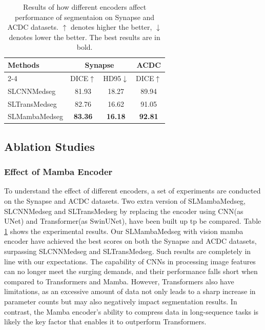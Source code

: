 \documentclass[letterpaper, 10 pt, conference]{ieeeconf}  %
\begin{document}
\begin{table}[h]
\small
\centering
\begin{tabular}{l|cc|c}\hline
\multirow{2}{*}{Methods} & \multicolumn{2}{c|}{Synapse} & ACDC \\\cline{2-4}
& DICE$\uparrow$ & HD95$\downarrow$ & DICE$\uparrow$ \\\hline
SLCNNMedseg & 81.93 &18.27& 89.94\\
SLTransMedseg & 82.76 & 16.62 & 91.05\\\hline
SLMambaMedseg & \textbf{83.36} & \textbf{16.18} & \textbf{92.81} \\\hline
\end{tabular}
\caption{Results of how different encoders affect performance of segmentaion on Synapse and ACDC datasets. $\uparrow$ denotes higher the better, $\downarrow$ denotes lower the better. The best results are in bold.}
\label{table3}
\end{table}

\subsection{Ablation Studies}


\subsubsection{Effect of Mamba Encoder}

To understand the effect of different encoders, a set of experiments are conducted on the Synapse and ACDC datasets. Two extra version of SLMambaMedseg, SLCNNMedseg and SLTransMedseg by replacing the encoder using CNN(as UNet\cite{ronneberger2015unet}) and Transformer(as SwinUNet\cite{cao2021swinunet}), have been built up tp be compared. Table \textcolor{red}{\ref{table3}} shows the experimental results. Our SLMambaMedseg with vision mamba encoder have achieved the best scores on both the Synapse and ACDC datasets, surpassing SLCNNMedseg and SLTransMedseg. Such results are completely in line with our expectations. The capability of CNNs in processing image features can no longer meet the surging demands, and their performance falls short when compared to Transformers and Mamba. However, Transformers also have limitations, as an excessive amount of data not only leads to a sharp increase in parameter counts but may also negatively impact segmentation results. In contrast, the Mamba encoder's ability to compress data in long-sequence\cite{yu2024mambaout} tasks is likely the key factor that enables it to outperform Transformers.
\end{document}
